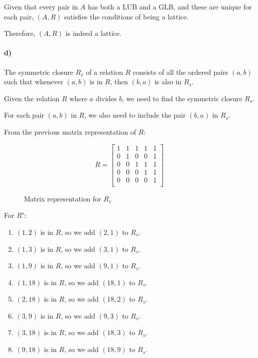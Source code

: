 \documentclass[12pt]{article}
\begin{document}
Given that every pair in \( A \) has both a LUB and a GLB, and these are unique for each pair, \( (A, R) \) satisfies the conditions of being a lattice.

Therefore, \( (A, R) \) is indeed a lattice.\\

\paragraph{d)}

The symmetric closure \( R_s \) of a relation \( R \) consists of all the ordered pairs \( (a, b) \) such that whenever \( (a, b) \) is in \( R \), then \( (b, a) \) is also in \( R_s \).

Given the relation \( R \) where \( a \) divides \( b \), we need to find the symmetric closure \( R_s \).

For each pair \( (a, b) \) in \( R \), we also need to include the pair \( (b, a) \) in \( R_s \).

From the previous matrix representation of \( R \):



\begin{figure}[H]

\[
R = \begin{bmatrix}
1 & 1 & 1 & 1 & 1 \\
0 & 1 & 0 & 0 & 1 \\
0 & 0 & 1 & 1 & 1 \\
0 & 0 & 0 & 1 & 1 \\
0 & 0 & 0 & 0 & 1 \\
\end{bmatrix}
\]
\caption{Matrix representation for \(R_s\)}
\end{figure}

For \( R^s \):

\begin{enumerate}
    \item \( (1, 2) \) is in \( R \), so we add \( (2, 1) \) to \( R_s \).
    \item \( (1, 3) \) is in \( R \), so we add \( (3, 1) \) to \( R_s \).
    \item \( (1, 9) \) is in \( R \), so we add \( (9, 1) \) to \( R_s \).
    \item \( (1, 18) \) is in \( R \), so we add \( (18, 1) \) to \( R_s \).
    \item \( (2, 18) \) is in \( R \), so we add \( (18, 2) \) to \( R_s \).
    \item \( (3, 9) \) is in \( R \), so we add \( (9, 3) \) to \( R_s \).
    \item \( (3, 18) \) is in \( R \), so we add \( (18, 3) \) to \( R_s \).
    \item \( (9, 18) \) is in \( R \), so we add \( (18, 9) \) to \( R_s \).
\end{enumerate}
\end{document}
